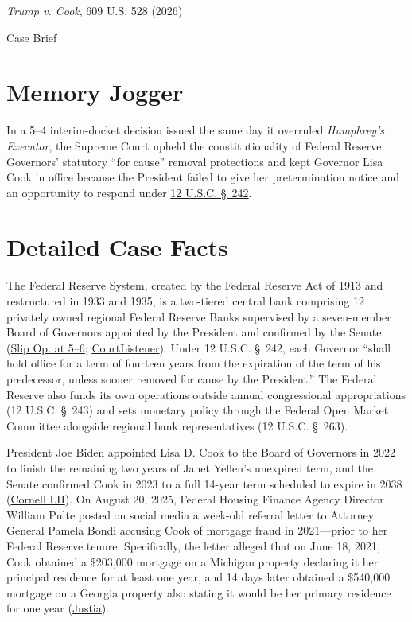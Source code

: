 \documentclass[12pt]{article}
\begin{document}
\begin{center}
{\LARGE \textit{Trump v. Cook}, 609 U.S. 528 (2026)\par}
\vspace{0.8em}
{\large Case Brief\par}
\end{center}
\vspace{1em}

\section{Memory Jogger}

In a 5--4 interim-docket decision issued the same day it overruled \textit{Humphrey's Executor}, the Supreme Court upheld the constitutionality of Federal Reserve Governors' statutory ``for cause'' removal protections and kept Governor Lisa Cook in office because the President failed to give her pretermination notice and an opportunity to respond under \href{https://www.law.cornell.edu/supremecourt/text/25A312}{12 U.S.C. \S~242}.

\section{Detailed Case Facts}

The Federal Reserve System, created by the Federal Reserve Act of 1913 and restructured in 1933 and 1935, is a two-tiered central bank comprising 12 privately owned regional Federal Reserve Banks supervised by a seven-member Board of Governors appointed by the President and confirmed by the Senate (\href{https://www.supremecourt.gov/opinions/25pdf/25a312_5468.pdf}{Slip Op. at 5--6}; \href{https://www.courtlistener.com/opinion/10881682/trump-v-cook/}{CourtListener}). Under 12 U.S.C. \S~242, each Governor ``shall hold office for a term of fourteen years from the expiration of the term of his predecessor, unless sooner removed for cause by the President.'' The Federal Reserve also funds its own operations outside annual congressional appropriations (12 U.S.C. \S~243) and sets monetary policy through the Federal Open Market Committee alongside regional bank representatives (12 U.S.C. \S~263).

President Joe Biden appointed Lisa D. Cook to the Board of Governors in 2022 to finish the remaining two years of Janet Yellen's unexpired term, and the Senate confirmed Cook in 2023 to a full 14-year term scheduled to expire in 2038 (\href{https://www.law.cornell.edu/supremecourt/text/25A312}{Cornell LII}). On August 20, 2025, Federal Housing Finance Agency Director William Pulte posted on social media a week-old referral letter to Attorney General Pamela Bondi accusing Cook of mortgage fraud in 2021---prior to her Federal Reserve tenure. Specifically, the letter alleged that on June 18, 2021, Cook obtained a \$203,000 mortgage on a Michigan property declaring it her principal residence for at least one year, and 14 days later obtained a \$540,000 mortgage on a Georgia property also stating it would be her primary residence for one year (\href{https://supreme.justia.com/cases/federal/us/609/25a312/}{Justia}).
\end{document}
